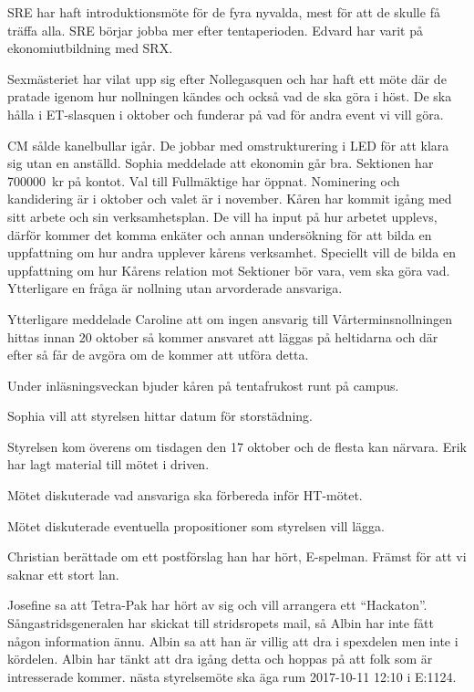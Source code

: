 \documentclass[10pt]{article}
\begin{document}
\begin{paragrafer}
\begin{paragrafer}
SRE har haft introduktionsmöte för de fyra nyvalda, mest för att de skulle få träffa alla. SRE börjar jobba mer efter tentaperioden. Edvard har varit på ekonomiutbildning med SRX.

Sexmästeriet har vilat upp sig efter Nollegasquen och har haft ett möte där de pratade igenom hur nollningen kändes och också vad de ska göra i höst. De ska hålla i ET-slasquen i oktober och funderar på vad för andra event vi vill göra.

CM sålde kanelbullar igår. De jobbar med omstrukturering i LED för att klara sig utan en anställd.
Sophia meddelade att ekonomin går bra. Sektionen har \SI{700000}{kr} på kontot.
Val till Fullmäktige har öppnat. Nominering och kandidering är i oktober och valet är i november. Kåren har kommit igång med sitt arbete och sin verksamhetsplan. De vill ha input på hur arbetet upplevs, därför kommer det komma enkäter och annan undersökning för att bilda en uppfattning om hur andra upplever kårens verksamhet. Speciellt vill de bilda en uppfattning om hur Kårens relation mot Sektioner bör vara, vem ska göra vad. Ytterligare en fråga är nollning utan arvorderade ansvariga.

Ytterligare meddelade Caroline att om ingen ansvarig till Vårterminsnollningen hittas innan 20 oktober så kommer ansvaret att läggas på heltidarna och där efter så får de avgöra om de kommer att utföra detta.

Under inläsningsveckan bjuder kåren på tentafrukost runt på campus.
\end{paragrafer}

Sophia vill att styrelsen hittar datum för storstädning.

Styrelsen kom överens om tisdagen den 17 oktober och de flesta kan närvara.
Erik har lagt material till mötet i driven.

Mötet diskuterade vad ansvariga ska förbereda inför HT-mötet.

Mötet diskuterade eventuella propositioner som styrelsen vill lägga.

Christian berättade om ett postförslag han har hört, E-spelman. Främst för att vi saknar ett stort lan.

Josefine sa att Tetra-Pak har hört av sig och vill arrangera ett ``Hackaton''.
Sångastridsgeneralen har skickat till stridsropets mail, så Albin har inte fått någon information ännu. Albin sa att han är villig att dra i spexdelen men inte i kördelen. Albin har tänkt att dra igång detta och hoppas på att folk som är intresserade kommer.
{\Mba} nästa styrelsemöte ska äga rum 2017-10-11 12:10 i E:1124.


\end{paragrafer}
\end{document}
